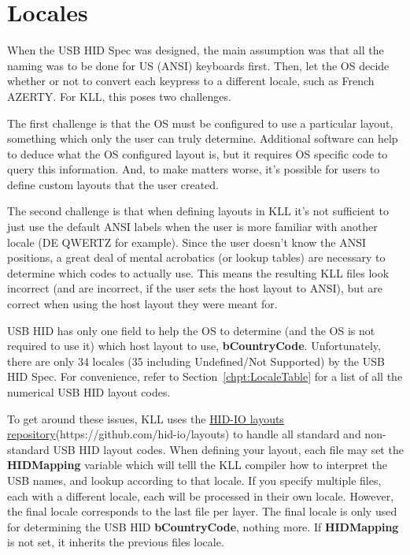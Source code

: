 \documentclass{kiibohd-template}
\begin{document}
\section{Locales}
\label{sec:locales}

When the USB HID Spec was designed, the main assumption was that all the naming was to be done for US (ANSI) keyboards first.
Then, let the OS decide whether or not to convert each keypress to a different locale, such as French AZERTY.
For KLL, this poses two challenges.

The first challenge is that the OS must be configured to use a particular layout, something which only the user can truly determine.
Additional software can help to deduce what the OS configured layout is, but it requires OS specific code to query this information.
And, to make matters worse, it's possible for users to define custom layouts that the user created.

The second challenge is that when defining layouts in KLL it's not sufficient to just use the default ANSI labels when the user is more familiar with another locale (DE QWERTZ for example).
Since the user doesn't know the ANSI positions, a great deal of mental acrobatics (or lookup tables) are necessary to determine which codes to actually use.
This means the resulting KLL files look incorrect (and are incorrect, if the user sets the host layout to ANSI), but are correct when using the host layout they were meant for.

USB HID has only one field to help the OS to determine (and the OS is not required to use it) which host layout to use, \textbf{bCountryCode}.
Unfortunately, there are only 34 locales (35 including Undefined/Not Supported) by the USB HID Spec.
For convenience, refer to Section~\ref{chpt:LocaleTable} for a list of all the numerical USB HID layout codes.

To get around these issues, KLL uses the \href{https://github.com/hid-io/layouts}{HID-IO layouts repository}(https://github.com/hid-io/layouts) to handle all standard and non-standard USB HID layout codes.
When defining your layout, each file may set the \textbf{HIDMapping} variable which will telll the KLL compiler how to interpret the USB names, and lookup according to that locale.
If you specify multiple files, each with a different locale, each will be processed in their own locale.
However, the final locale corresponds to the last file per layer.
The final locale is only used for determining the USB HID \textbf{bCountryCode}, nothing more.
If \textbf{HIDMapping} is not set, it inherits the previous files locale.
\end{document}
